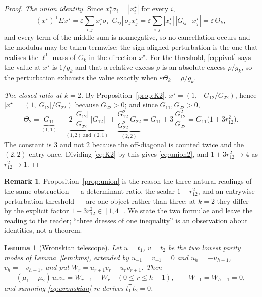 \documentclass[11pt,a4paper]{article}
\theoremstyle{plain}
\newtheorem{lemma}[theorem]{Lemma}
\theoremstyle{definition}
\newtheorem{remark}[theorem]{Remark}
\newcommand{\T}{\mathsf{T}}
\begin{document}
\begin{proof}
\emph{The union identity.} Since $x^{\star}_i\sigma_i=|x^{\star}_i|$ for every
$i$,
\[
  (x^{\star})^{\T}Ex^{\star}
  =\varepsilon\sum_{i,j}x^{\star}_i\sigma_i\,|G_{ij}|\,\sigma_jx^{\star}_j
  =\varepsilon\sum_{i,j}|x^{\star}_i|\,|G_{ij}|\,|x^{\star}_j|
  =\varepsilon\,\Theta_k ,
\]
and every term of the middle sum is nonnegative, so no cancellation occurs and
the modulus may be taken termwise: the sign-aligned perturbation is the one
that realises the $\ell^{1}$ mass of $G_k$ in the direction $x^{\star}$. For
the threshold, \eqref{eq:pivot} says the value at $x^{\star}$ is $1/g_k$ and
that a relative excess $\rho$ is an absolute excess $\rho/g_k$, so the
perturbation exhausts the value exactly when $\varepsilon\Theta_k=\rho/g_k$.

\emph{The closed ratio at $k=2$.} By Proposition~\ref{prop:K2},
$x^{\star}=(1,-G_{12}/G_{22})$, hence $|x^{\star}|=(1,|G_{12}|/G_{22})$ because
$G_{22}>0$; and since $G_{11},G_{22}>0$,
\[
  \Theta_2
  =\underbrace{G_{11}}_{(1,1)}
  +\underbrace{2\,\frac{|G_{12}|}{G_{22}}\,|G_{12}|}_{(1,2)\text{ and }(2,1)}
  +\underbrace{\frac{G_{12}^{2}}{G_{22}^{2}}\,G_{22}}_{(2,2)}
  =G_{11}+3\,\frac{G_{12}^{2}}{G_{22}}
  =G_{11}\bigl(1+3r_{12}^{2}\bigr).
\]
The constant is $3$ and not $2$ because the off-diagonal is counted twice and
the $(2,2)$ entry once. Dividing \eqref{eq:K2} by this gives
\eqref{eq:union2}, and $1+3r_{12}^{2}\to4$ as $r_{12}^{2}\to1$.
\end{proof}

\begin{remark}
\label{rem:onedress}
Proposition~\ref{prop:union} is the reason the three natural readings of the
same obstruction --- a determinant ratio, the scalar $1-r_{12}^{2}$, and an
entrywise perturbation threshold --- are one object rather than three: at $k=2$
they differ by the explicit factor $1+3r_{12}^{2}\in[1,4]$. We state the two
formulae and leave the reading to the reader; ``three dresses of one
inequality'' is an observation about identities, not a theorem.
\end{remark}

\begin{lemma}[Wronskian telescope]
\label{lem:wronskian}
Let $u=t_1$, $v=t_2$ be the two lowest parity modes of Lemma~\ref{lem:kms},
extended by $u_{-1}=v_{-1}=0$ and $u_h=-u_{h-1}$, $v_h=-v_{h-1}$, and put
$W_r=u_{r+1}v_r-u_rv_{r+1}$. Then
\begin{equation}
\label{eq:wronskian}
  (\mu_1-\mu_2)\,u_rv_r=W_{r-1}-W_r\quad(0\le r\le h-1),
  \qquad W_{-1}=W_{h-1}=0,
\end{equation}
and summing \eqref{eq:wronskian} re-derives $t_1^{\T}t_2=0$.
\end{lemma}
\end{document}
